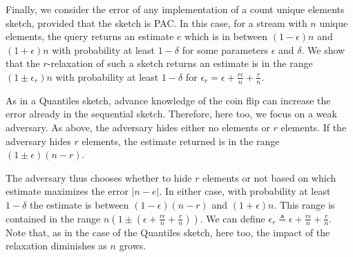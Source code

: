 Finally, we consider the error of any implementation of a count unique elements sketch, provided
that the sketch is PAC. In this case, for a stream with $n$ unique elements, the query returns an estimate $e$ which is in between
$(1-\epsilon)n$ and $(1+\epsilon)n$ with probability at least $1-\delta$ for some parameters
$\epsilon$ and $\delta$. We show that the $r$-relaxation of such a sketch returns an estimate
is in the range $(1 \pm \epsilon_r)n$ with probability at least $1-\delta$
for $\epsilon_r=\epsilon+\frac{r \epsilon}{n}+\frac{r}{n}$.

As in a Quantiles sketch, advance knowledge of the coin flip can increase the
error already in the sequential sketch. Therefore, here too, we focus on a weak adversary.  
As above, the adversary hides either no
elements or $r$ elements. If the adversary hides $r$ elements, the estimate returned is in the range
$(1 \pm \epsilon)(n-r)$.

The adversary thus chooses whether to hide $r$ elements or not based on which estimate maximizes the
error $|n-e|$. In either case, with probability at least $1-\delta$ the estimate is between
$(1-\epsilon)(n-r)$ and $(1+\epsilon)n$. This range is contained in the range
$n\left(1 \pm \left(\epsilon+\frac{r \epsilon}{n}+\frac{r}{n}\right)\right)$. We can define
$\epsilon_r \triangleq \epsilon+\frac{r \epsilon}{n}+\frac{r}{n}$. Note that, as in the case of the
Quantiles sketch, here too, the impact of the relaxation diminishes as $n$ grows.